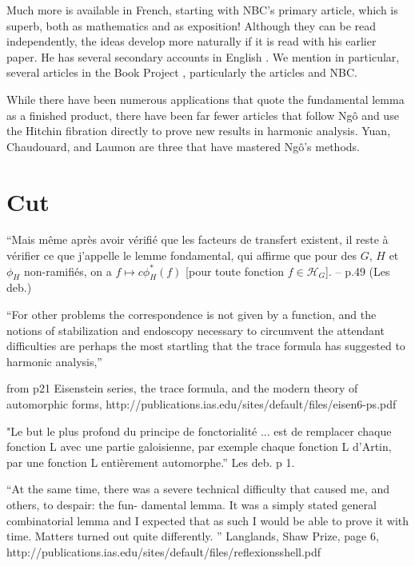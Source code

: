 \documentclass[brochure,english,12pt]{bourbaki}
\begin{document}
Much more is available in French, starting with NBC's primary article,
which is superb, both as mathematics and as exposition!  Although they
can be read independently, the ideas develop more naturally if it is
read with his earlier paper.  He has several secondary accounts in
English \cite{XX}.  We mention in particular, several articles in the
Book Project \cite{Harris}, particularly the articles \cite{Dat}
and NBC.

While there have been numerous applications that quote the fundamental
lemma as a finished product, there have been far fewer articles that
follow Ng\^o and use the Hitchin fibration directly to prove new
results in harmonic analysis.  Yuan, Chaudouard, and Laumon are three that
have mastered Ng\^o's methods.

\section{Cut}


{\narrower \it

``Mais m\^eme apr\`es avoir
v\'erifi\'e que les facteurs de
transfert existent, il reste \`a v\'erifier ce que j'appelle le
lemme fondamental, qui affirme que pour des $G$, $H$ et $\phi_H$
non-ramifi\'es, on a $f\mapsto c \phi_H^*(f)$ [pour toute fonction $f\in {\mathcal H}_G$]. -- p.49 (Les deb.)  
}

\bigskip

``For other problems the correspondence is not given by a function, and the notions of 
stabilization and endoscopy necessary to circumvent the attendant difficulties are perhaps 
the most startling that the trace formula has suggested to harmonic analysis,'' 

from p21 Eisenstein series, the trace formula, and the modern theory of automorphic forms, http://publications.ias.edu/sites/default/files/eisen6-ps.pdf

"Le but le plus profond du principe de fonctorialit\'e ... est de remplacer chaque fonction L avec une partie galoisienne, par exemple chaque fonction L d'Artin, par une fonction L enti\`erement automorphe.'' Les deb. p 1.

``At the same 
time, there was a severe technical difficulty that caused me, and others, to despair: the fun- 
damental lemma. It was a simply stated general combinatorial lemma and I expected that as 
such I would be able to prove it with time. Matters turned out quite differently. ''  Langlands, Shaw Prize, page 6,
http://publications.ias.edu/sites/default/files/reflexionsshell.pdf
\end{document}
